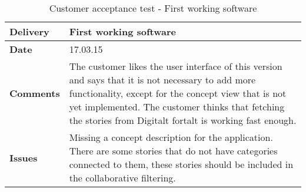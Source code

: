 \renewcommand{\arraystretch}{2}%
\begin{center}
	\small
	\begin{longtable}{ | p{4cm} | p{13cm} | }
		
		\caption[Customer acceptance test - First working software]{Customer acceptance test - First working software } \label{Tab:cattest3}\\
		\hline
		\textbf{Delivery} & First working software\\ \hline
		\textbf{Date} & 17.03.15 \\ \hline
		\textbf{Comments} & The customer likes the user interface of this version and says that it is not necessary to add more functionality, except for the concept view that is not yet implemented. The customer thinks that fetching the stories from Digitalt fortalt is working fast enough.  \\ \hline			
		\textbf{Issues} & 
		Missing a concept description for the application. There are some stories that do not have categories connected to them, these stories should be included in the collaborative filtering.
		\\ \hline		
	\end{longtable}
\end{center}

